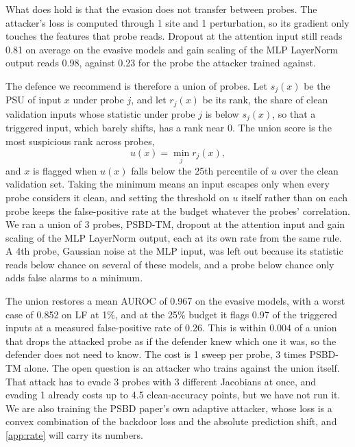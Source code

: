 What does hold is that the evasion does not transfer between probes. The attacker's loss is computed through 1 site and 1 perturbation, so its gradient only touches the features that probe reads. Dropout at the attention input still reads 0.81 on average on the evasive models and gain scaling of the MLP LayerNorm output reads 0.98, against 0.23 for the probe the attacker trained against.

The defence we recommend is therefore a union of probes. Let $s_j(x)$ be the PSU of input $x$ under probe $j$, and let $r_j(x)$ be its rank, the share of clean validation inputs whose statistic under probe $j$ is below $s_j(x)$, so that a triggered input, which barely shifts, has a rank near 0. The union score is the most suspicious rank across probes,
\begin{equation}
  u(x) = \min_{j} r_j(x),
\end{equation}
and $x$ is flagged when $u(x)$ falls below the 25th percentile of $u$ over the clean validation set. Taking the minimum means an input escapes only when every probe considers it clean, and setting the threshold on $u$ itself rather than on each probe keeps the false-positive rate at the budget whatever the probes' correlation. We ran a union of 3 probes, PSBD-TM, dropout at the attention input and gain scaling of the MLP LayerNorm output, each at its own rate from the same rule. A 4th probe, Gaussian noise at the MLP input, was left out because its statistic reads below chance on several of these models, and a probe below chance only adds false alarms to a minimum.

The union restores a mean AUROC of 0.967 on the evasive models, with a worst case of 0.852 on LF at 1\%, and at the 25\% budget it flags 0.97 of the triggered inputs at a measured false-positive rate of 0.26. This is within 0.004 of a union that drops the attacked probe as if the defender knew which one it was, so the defender does not need to know. The cost is 1 sweep per probe, 3 times PSBD-TM alone. The open question is an attacker who trains against the union itself. That attack has to evade 3 probes with 3 different Jacobians at once, and evading 1 already costs up to 4.5 clean-accuracy points, but we have not run it. We are also training the PSBD paper's own adaptive attacker, whose loss is a convex combination of the backdoor loss and the absolute prediction shift, and \cref{app:rate} will carry its numbers.

